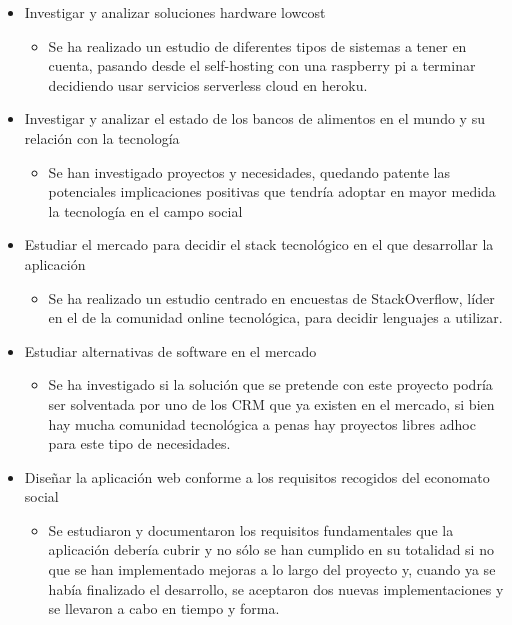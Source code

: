 \begin{itemize}
    \item Investigar y analizar soluciones hardware lowcost
    \begin{itemize}
        \item Se ha realizado un estudio de diferentes tipos de sistemas a tener en cuenta, pasando desde el self-hosting con una raspberry pi a terminar decidiendo usar servicios serverless cloud en heroku.
    \end{itemize}
    \item Investigar y analizar el estado de los bancos de alimentos en el mundo y su relación con la tecnología
    \begin{itemize}
        \item Se han investigado proyectos y necesidades, quedando patente las potenciales implicaciones positivas que tendría adoptar en mayor medida la tecnología en el campo social
    \end{itemize}
    \item Estudiar el mercado para decidir el stack tecnológico en el que desarrollar la aplicación
    \begin{itemize}
        \item Se ha realizado un estudio centrado en encuestas de StackOverflow, líder en el de la comunidad online tecnológica, para decidir lenguajes a utilizar.
    \end{itemize}
    \item Estudiar alternativas de software en el mercado
    \begin{itemize}
        \item Se ha investigado si la solución que se pretende con este proyecto podría ser solventada por uno de los CRM que ya existen en el mercado, si bien hay mucha comunidad tecnológica a penas hay proyectos libres adhoc para este tipo de necesidades.
    \end{itemize}
    \item Diseñar la aplicación web conforme a los requisitos recogidos del economato social
    \begin{itemize}
        \item Se estudiaron y documentaron los requisitos fundamentales que la aplicación debería cubrir y no sólo se han cumplido en su totalidad si no que se han implementado mejoras a lo largo del proyecto y, cuando ya se había finalizado el desarrollo, se aceptaron dos nuevas implementaciones y se llevaron a cabo en tiempo y forma.
    \end{itemize}

\end{itemize}
